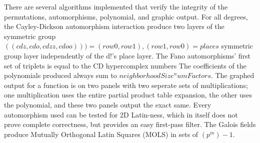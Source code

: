 \documentclass[11pt]{article}
\begin{document}
There are several algorithms implemented that verify the integrity of the permutations, automorphisms, polynomial, and graphic output. For all degrees, the Cayley-Dickson automorphism interaction produce two layers of the symmetric group $((cdz,cdo,cdzz,cdoo))) = (row0,row1),(row1,row0) = places$ symmetric group layer independently of the d!'s place layer. The Fano automorphisms' first set of triplets is equal to the CD hypercomplex numbers The coefficients of the polynomials produced always sum to $neighborhoodSize^numFactors$. The graphed output for a function is on two panels with two seperate sets of multiplications; one multiplication uses the entire partial product table expansion, the other uses the polynomial, and these two panels output the exact same. Every automorphism used can be tested for 2D Latin-ness, which in itself does not prove complete correctness, but provides an easy first-pass filter. The Galois fields produce Mutually Orthogonal Latin Squares (MOLS) in sets of $(p^m)-1$. 
\end{document}
